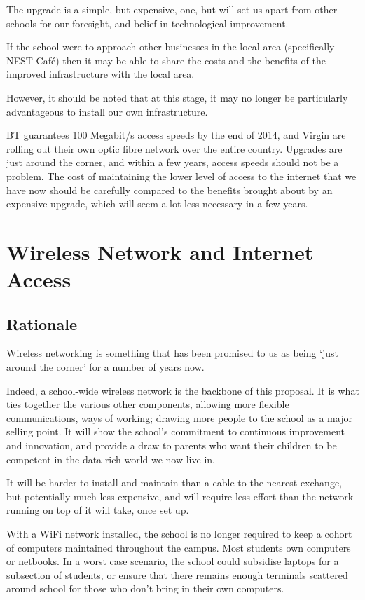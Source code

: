 \documentclass[a4paper,leqno,titlepage]{article}
\begin{document}
The upgrade is a simple, but expensive, one, but will set us apart from other
schools for our foresight, and belief in technological improvement.


If the school were to approach other businesses in the local area (specifically
NEST Café) then it may be able to share the costs and the benefits of the
improved infrastructure with the local area.


However, it should be noted that at this stage, it may no longer be particularly
advantageous to install our own infrastructure.

BT guarantees 100 Megabit/s access speeds by the end of 2014,
and Virgin are rolling out their own optic fibre network over
the entire country. Upgrades are just around the corner, and within a few years,
access speeds should not be a problem. The cost of maintaining the lower level
of access to the internet that we have now should be carefully compared to
the benefits brought about by an expensive upgrade, which will seem a lot less
necessary in a few years.




\section{Wireless Network and Internet Access}


\subsection{Rationale}

Wireless networking is something that has been promised to us as being `just
around the corner' for a number of years now.


Indeed, a school-wide wireless network is the backbone of this proposal. It is
what ties together the various other components, allowing more flexible
communications, ways of working; drawing more people to the school as a
major selling point. It will show the school's commitment to continuous
improvement and innovation, and provide a draw to parents who want their
children to be competent in the data-rich world we now live in.


It will be harder to install and maintain than a cable to the nearest exchange,
but potentially much less expensive, and will require less effort than the network
running on top of it will take, once set up.


With a WiFi network installed, the school is no longer required to keep a cohort
of computers maintained throughout the campus. Most students own computers
or netbooks. In a worst case scenario, the school could subsidise laptops for a
subsection of students, or ensure that there remains enough terminals scattered
around school for those who don't bring in their own computers.
\end{document}
